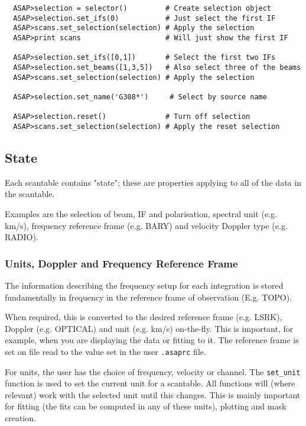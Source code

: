 \documentclass[11pt]{article}
\newcommand{\cmd}[1]{{\tt #1}}
\begin{document}
\begin{verbatim}
  ASAP>selection = selector()         # Create selection object
  ASAP>selection.set_ifs(0)           # Just select the first IF
  ASAP>scans.set_selection(selection) # Apply the selection
  ASAP>print scans                    # Will just show the first IF

  ASAP>selection.set_ifs([0,1])       # Select the first two IFs
  ASAP>selection.set_beams([1,3,5])   # Also select three of the beams
  ASAP>scans.set_selection(selection) # Apply the selection

  ASAP>selection.set_name('G308*')     # Select by source name

  ASAP>selection.reset()              # Turn off selection
  ASAP>scans.set_selection(selection) # Apply the reset selection

\end{verbatim}

\subsection{State}

Each scantable contains "state"; these are
properties applying to all of the data in the scantable.

Examples are the selection of beam, IF and polarisation,  spectral unit
(e.g. km/s), frequency reference frame (e.g. BARY) and velocity Doppler
type (e.g. RADIO).

\subsubsection{Units, Doppler and Frequency Reference Frame}

The information describing the frequency setup for each integration
is stored fundamentally in frequency in the reference frame
of observation (E.g. TOPO).

When required, this is converted to the desired reference frame
(e.g. LSRK), Doppler (e.g. OPTICAL) and unit (e.g. km/s) on-the-fly.
This is important, for example, when you are displaying the data or
fitting to it. The reference frame is set on file read to the value
set in the user \cmd{.asaprc} file.

For units, the user has the choice of frequency, velocity or channel.
The \cmd{set\_unit} function is used to set the current unit for a
scantable. All functions will (where relevant) work with the selected
unit until this changes. This is mainly important for fitting (the fits
can be computed in any of these units), plotting and mask creation.
\end{document}
